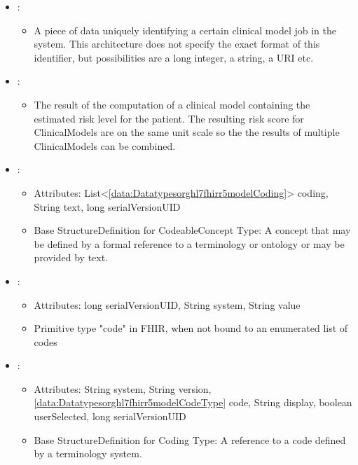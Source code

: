 \begin{itemize}[nolistsep,noitemsep]
\item {}: 
\begin{itemize}[noitemsep,nolistsep]

\item[]  A piece of data uniquely identifying a certain clinical model job in the system. This architecture does not specify the exact format of this identifier,
but possibilities are a long integer, a string, a URI etc.
\end{itemize}

\item {}: 
\begin{itemize}[noitemsep,nolistsep]

\item[] The result of the computation of a clinical model containing the estimated
risk level for the patient.
The resulting risk score for ClinicalModels are on the same unit scale so the the results of multiple ClinicalModels can be combined.
\end{itemize}

\item {}: 
\begin{itemize}[noitemsep,nolistsep]
\item[] Attributes: List\textless{}\ref{data:Datatypesorghl7fhirr5modelCoding}\textgreater{} coding, String text, long serialVersionUID
\item[] Base StructureDefinition for CodeableConcept Type: A concept that may be defined by a formal reference to a terminology or ontology or may be provided by text.
\end{itemize}

\item {}: 
\begin{itemize}[noitemsep,nolistsep]
\item[] Attributes: long serialVersionUID, String system, String value
\item[] Primitive type "code" in FHIR, when not bound to an enumerated list of codes
\end{itemize}

\item {}: 
\begin{itemize}[noitemsep,nolistsep]
\item[] Attributes: String system, String version, \ref{data:Datatypesorghl7fhirr5modelCodeType} code, String display, boolean userSelected, long serialVersionUID
\item[] Base StructureDefinition for Coding Type: A reference to a code defined by a terminology system.
\end{itemize}


\end{itemize}
